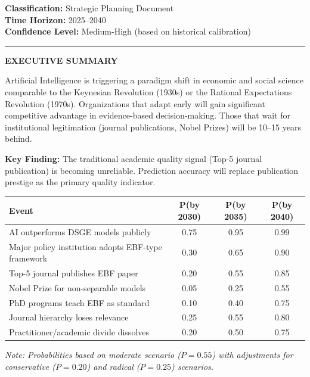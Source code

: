 \begin{tcolorbox}[colback=green!3!white, colframe=green!75!black,
    title=\textbf{EXECUTIVE BRIEF: Preparing for the Post-EBF Scientific Landscape}]

\textbf{Classification:} Strategic Planning Document \\
\textbf{Time Horizon:} 2025--2040 \\
\textbf{Confidence Level:} Medium-High (based on historical calibration)

\vspace{0.5em}
\hrule
\vspace{0.5em}

\textbf{EXECUTIVE SUMMARY}

Artificial Intelligence is triggering a paradigm shift in economic and social science
comparable to the Keynesian Revolution (1930s) or the Rational Expectations Revolution (1970s).
Organizations that adapt early will gain significant competitive advantage in evidence-based
decision-making. Those that wait for institutional legitimation (journal publications,
Nobel Prizes) will be 10--15 years behind.

\textbf{Key Finding:} The traditional academic quality signal (Top-5 journal publication)
is becoming unreliable. Prediction accuracy will replace publication prestige as the
primary quality indicator.

\end{tcolorbox}

\begin{tcolorbox}[colback=yellow!5!white, colframe=yellow!75!black,
    title=\textbf{PROBABILITY MATRIX: Key Events 2025--2040}]

\renewcommand{\arraystretch}{1.4}
\begin{tabular}{@{}p{6cm}ccc@{}}
\toprule
\textbf{Event} & \textbf{P(by 2030)} & \textbf{P(by 2035)} & \textbf{P(by 2040)} \\
\midrule
AI outperforms DSGE models publicly & 0.75 & 0.95 & 0.99 \\
Major policy institution adopts EBF-type framework & 0.30 & 0.65 & 0.90 \\
Top-5 journal publishes EBF paper & 0.20 & 0.55 & 0.85 \\
Nobel Prize for non-separable models & 0.05 & 0.25 & 0.55 \\
PhD programs teach EBF as standard & 0.10 & 0.40 & 0.75 \\
Journal hierarchy loses relevance & 0.25 & 0.55 & 0.80 \\
Practitioner/academic divide dissolves & 0.20 & 0.50 & 0.75 \\
\bottomrule
\end{tabular}

\vspace{0.5em}
\textit{Note: Probabilities based on moderate scenario ($P=0.55$) with adjustments
for conservative ($P=0.20$) and radical ($P=0.25$) scenarios.}

\end{tcolorbox}

